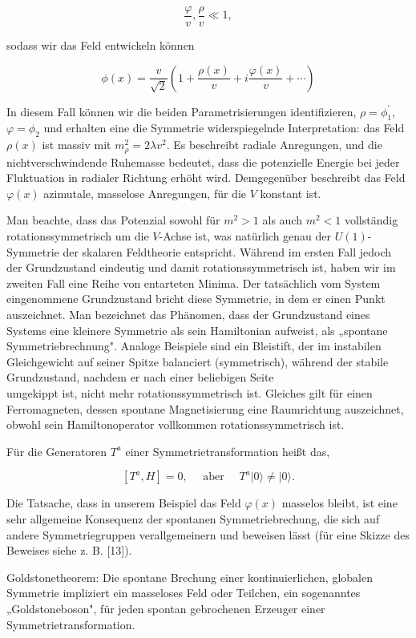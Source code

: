 \documentclass[10pt, letterpaper]{article}
\begin{document}
$$
\frac{\varphi}{v}, \frac{\rho}{v} \ll 1,
$$

sodass wir das Feld entwickeln können

$$
\phi(x)=\frac{v}{\sqrt{2}}\left(1+\frac{\rho(x)}{v}+i \frac{\varphi(x)}{v}+\cdots\right)
$$

In diesem Fall können wir die beiden Parametrisierungen identifizieren, $\rho=\phi_{1}^{\prime}$, $\varphi=\phi_{2}$ und erhalten eine die Symmetrie widerspiegelnde Interpretation: das Feld $\rho(x)$ ist massiv mit $m_{\rho}^{2}=2 \lambda v^{2}$. Es beschreibt radiale Anregungen, und die nichtverschwindende Ruhemasse bedeutet, dass die potenzielle Energie bei jeder Fluktuation in radialer Richtung erhöht wird. Demgegenüber beschreibt das Feld $\varphi(x)$ azimutale, masselose Anregungen, für die $V$ konstant ist.

Man beachte, dass das Potenzial sowohl für $m^{2}>1$ als auch $m^{2}<1$ vollständig rotationssymmetrisch um die $V$-Achse ist, was natürlich genau der $U(1)$-Symmetrie der skalaren Feldtheorie entspricht. Während im ersten Fall jedoch der Grundzustand eindeutig und damit rotationssymmetrisch ist, haben wir im zweiten Fall eine Reihe von entarteten Minima. Der tatsächlich vom System eingenommene Grundzustand bricht diese Symmetrie, in dem er einen Punkt auszeichnet. Man bezeichnet das Phänomen, dass der Grundzustand eines Systems eine kleinere Symmetrie als sein Hamiltonian aufweist, als „spontane Symmetriebrechnung". Analoge Beispiele sind ein Bleistift, der im instabilen Gleichgewicht auf seiner Spitze balanciert (symmetrisch), während der stabile Grundzustand, nachdem er nach einer beliebigen Seite\\
umgekippt ist, nicht mehr rotationssymmetrisch ist. Gleiches gilt für einen Ferromagneten, dessen spontane Magnetisierung eine Raumrichtung auszeichnet, obwohl sein Hamiltonoperator vollkommen rotationssymmetrisch ist.

Für die Generatoren $T^{a}$ einer Symmetrietransformation heißt das,

$$
\left[T^{a}, H\right]=0, \quad \text { aber } \quad T^{a}|0\rangle \neq|0\rangle .
$$

Die Tatsache, dass in unserem Beispiel das Feld $\varphi(x)$ masselos bleibt, ist eine sehr allgemeine Konsequenz der spontanen Symmetriebrechung, die sich auf andere Symmetriegruppen verallgemeinern und beweisen lässt (für eine Skizze des Beweises siehe z. B. [13]).

Goldstonetheorem: Die spontane Brechung einer kontinuierlichen, globalen Symmetrie impliziert ein masseloses Feld oder Teilchen, ein sogenanntes „Goldstoneboson", für jeden spontan gebrochenen Erzeuger einer Symmetrietransformation.
\end{document}
